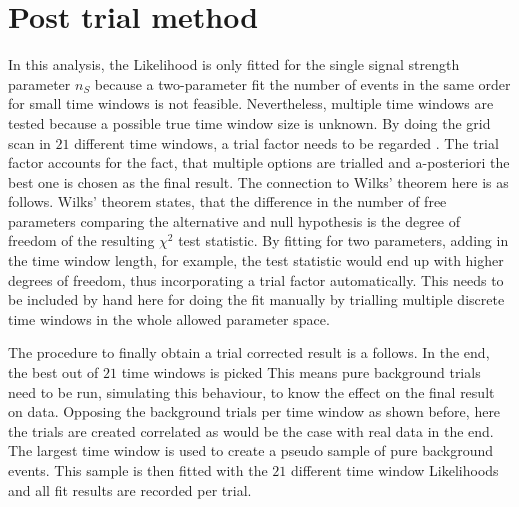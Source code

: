 
\section{Post trial method}
  \label{chp:time_dep_post_trial}
In this analysis, the Likelihood is only fitted for the single signal strength parameter $n_S$ because a two-parameter fit the number of events in the same order for small time windows is not feasible.
Nevertheless, multiple time windows are tested because a possible true time window size is unknown.
By doing the grid scan in $\num{21}$ different time windows, a trial factor needs to be regarded .
The trial factor accounts for the fact, that multiple options are trialled and a-posteriori the best one is chosen as the final result.
The connection to Wilks' theorem here is as follows.
Wilks' theorem states, that the difference in the number of free parameters comparing the alternative and null hypothesis is the degree of freedom of the resulting $\chi^2$ test statistic.
By fitting for two parameters, adding in the time window length, for example, the test statistic would end up with higher degrees of freedom, thus incorporating a trial factor automatically.
This needs to be included by hand here for doing the fit manually by trialling multiple discrete time windows in the whole allowed parameter space.

The procedure to finally obtain a trial corrected result is a follows.
In the end, the best out of $\num{21}$ time windows is picked
This means pure background trials need to be run, simulating this behaviour, to know the effect on the final result on data.
Opposing the background trials per time window as shown before, here the trials are created correlated as would be the case with real data in the end.
The largest time window is used to create a pseudo sample of pure background events.
This sample is then fitted with the $\num{21}$ different time window Likelihoods and all fit results are recorded per trial.

